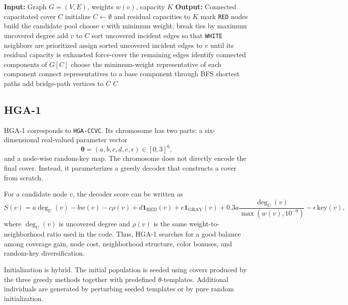 \documentclass[11pt]{article}
\begin{document}
\begin{algorithm}[h]
\caption{Greedy-3 / GWCCVC}
\begin{algorithmic}[1]
\State \textbf{Input:} Graph \(G=(V,E)\), weights \(w(v)\), capacity \(K\)
\State \textbf{Output:} Connected capacitated cover \(C\)
\State initialize \(C\gets\emptyset\) and residual capacities to \(K\)
    \State mark \texttt{RED} nodes
    \State build the candidate pool
    \State choose \(v\) with minimum weight; break ties by maximum uncovered degree
    \State add \(v\) to \(C\)
    \State sort uncovered incident edges so that \texttt{WHITE} neighbors are prioritized
    \State assign sorted uncovered incident edges to \(v\) until its residual capacity is exhausted
\EndWhile
{}
    \State force-cover the remaining edges
\EndIf
\State identify connected components of \(G[C]\)
\State choose the minimum-weight representative of each component
\State connect representatives to a base component through BFS shortest paths
\State add bridge-path vertices to \(C\)
\State \Return \(C\)
\end{algorithmic}
\end{algorithm}

\subsection{HGA-1}

HGA-1 corresponds to \texttt{HGA-CCVC}. Its chromosome has two parts: a six-dimensional real-valued parameter vector
\[
\boldsymbol{\theta}=(a,b,c,d,e,\epsilon)\in[0,3]^6,
\]
and a node-wise random-key map. The chromosome does not directly encode the final cover. Instead, it parameterizes a greedy decoder that constructs a cover from scratch.

For a candidate node \(v\), the decoder score can be written as
\[
S(v)=a\deg_U(v)-bw(v)-c\rho(v)+d\mathbf{1}_{\mathrm{RED}}(v)+e\mathbf{1}_{\mathrm{GRAY}}(v)+0.3a\frac{\deg_U(v)}{\max(w(v),10^{-9})}-\epsilon\,\mathrm{key}(v),
\]
where \(\deg_U(v)\) is uncovered degree and \(\rho(v)\) is the same weight-to-neighborhood ratio used in the code. Thus, HGA-1 searches for a good balance among coverage gain, node cost, neighborhood structure, color bonuses, and random-key diversification.

Initialization is hybrid. The initial population is seeded using covers produced by the three greedy methods together with predefined \(\theta\)-templates. Additional individuals are generated by perturbing seeded templates or by pure random initialization.
\end{document}
